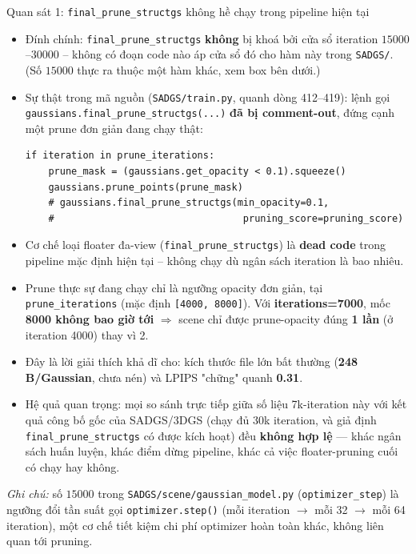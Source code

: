
\begin{frame}[fragile]{Quan sát 1: \texttt{final\_prune\_structgs} không hề chạy trong pipeline hiện tại}
\begin{itemize}
    \item Đính chính: \texttt{final\_prune\_structgs} \textbf{không} bị khoá bởi cửa sổ iteration $15000$--$30000$ -- không có đoạn code nào áp cửa sổ đó cho hàm này trong \texttt{SADGS/}. (Số $15000$ thực ra thuộc một hàm khác, xem box bên dưới.)
    \item Sự thật trong mã nguồn (\texttt{SADGS/train.py}, quanh dòng 412--419): lệnh gọi \texttt{gaussians.final\_prune\_structgs(...)} \textbf{đã bị comment-out}, đứng cạnh một prune đơn giản đang chạy thật:
\begin{verbatim}
if iteration in prune_iterations:
    prune_mask = (gaussians.get_opacity < 0.1).squeeze()
    gaussians.prune_points(prune_mask)
    # gaussians.final_prune_structgs(min_opacity=0.1,
    #                                 pruning_score=pruning_score)
\end{verbatim}
    \item[$\Rightarrow$] Cơ chế loại floater đa-view (\texttt{final\_prune\_structgs}) là \textbf{dead code} trong pipeline mặc định hiện tại -- không chạy dù ngân sách iteration là bao nhiêu.
    \item Prune thực sự đang chạy chỉ là ngưỡng opacity đơn giản, tại \texttt{prune\_iterations} (mặc định \texttt{[4000, 8000]}). Với \textbf{iterations=7000}, mốc \textbf{8000 không bao giờ tới} $\Rightarrow$ scene chỉ được prune-opacity đúng \textbf{1 lần} (ở iteration 4000) thay vì 2.
    \item Đây là lời giải thích khả dĩ cho: kích thước file lớn bất thường (\textbf{248 B/Gaussian}, chưa nén) và LPIPS "chững" quanh \textbf{0.31}.
    \item \alert{Hệ quả quan trọng:} mọi so sánh trực tiếp giữa số liệu 7k-iteration này với kết quả công bố gốc của SADGS/3DGS (chạy đủ 30k iteration, và giả định \texttt{final\_prune\_structgs} có được kích hoạt) đều \textbf{không hợp lệ} — khác ngân sách huấn luyện, khác điểm dừng pipeline, khác cả việc floater-pruning cuối có chạy hay không.
\end{itemize}
\vspace{1mm}
{\scriptsize \textit{Ghi chú:} số $15000$ trong \texttt{SADGS/scene/gaussian\_model.py} (\texttt{optimizer\_step}) là ngưỡng đổi tần suất gọi \texttt{optimizer.step()} (mỗi iteration $\to$ mỗi 32 $\to$ mỗi 64 iteration), một cơ chế tiết kiệm chi phí optimizer hoàn toàn khác, không liên quan tới pruning.}
\end{frame}

